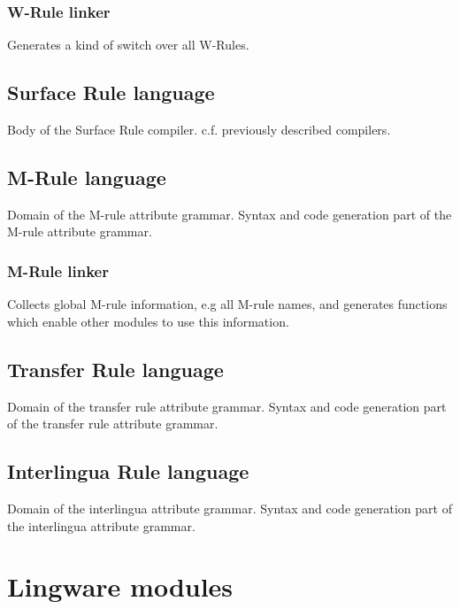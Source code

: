 \subsubsection{W-Rule linker}
\bsc
{} Generates a kind of switch over all W-Rules.
\esc


\subsection{Surface Rule language}
\bsc
{} Body of the Surface Rule compiler.
 c.f. previously described compilers.
\esc
\subsection{M-Rule language}
\bsc
{} Domain of the M-rule attribute grammar.
 Syntax and code generation part of the M-rule
                                attribute grammar.
\esc
\subsubsection{M-Rule linker}
\bsc
{} Collects global M-rule information, e.g all M-rule
                        names, and generates functions which enable other
                        modules to use this information.
\esc


\subsection{Transfer Rule language}
\bsc
{} Domain of the transfer rule attribute grammar.
  Syntax and code generation part of the
                               transfer rule attribute grammar.
\esc
\subsection{Interlingua Rule language}
\bsc
{} Domain of the interlingua attribute grammar.
 Syntax and code generation part of the
                               interlingua attribute grammar.
\esc

\newpage
\section{Lingware modules}

